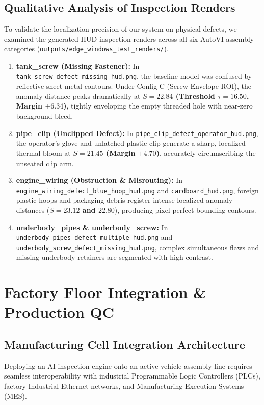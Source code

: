 \documentclass[journal,twocolumn]{IEEEtran}
\begin{document}
\subsection{Qualitative Analysis of Inspection Renders}
To validate the localization precision of our system on physical defects, we examined the generated HUD inspection renders across all six AutoVI assembly categories (\texttt{outputs/edge\_windows\_test\_renders/}).
\begin{enumerate}
    \item \textbf{tank\_screw (Missing Fastener):} In \texttt{tank\_screw\_defect\_missing\_hud.png}, the baseline model was confused by reflective sheet metal contours. Under Config C (Screw Envelope ROI), the anomaly distance peaks dramatically at \textbf{$S = 22.84$ (Threshold $\tau = 16.50$, Margin $+6.34$)}, tightly enveloping the empty threaded hole with near-zero background bleed.
    \item \textbf{pipe\_clip (Unclipped Defect):} In \texttt{pipe\_clip\_defect\_operator\_hud.png}, the operator's glove and unlatched plastic clip generate a sharp, localized thermal bloom at \textbf{$S = 21.45$ (Margin $+4.70$)}, accurately circumscribing the unseated clip arm.
    \item \textbf{engine\_wiring (Obstruction \& Misrouting):} In \texttt{engine\_wiring\_defect\_blue\_hoop\_hud.png} and \texttt{cardboard\_hud.png}, foreign plastic hoops and packaging debris register intense localized anomaly distances (\textbf{$S = 23.12$ and $22.80$}), producing pixel-perfect bounding contours.
    \item \textbf{underbody\_pipes \& underbody\_screw:} In \texttt{underbody\_pipes\_defect\_multiple\_hud.png} and \texttt{underbody\_screw\_defect\_missing\_hud.png}, complex simultaneous flaws and missing underbody retainers are segmented with high contrast.
\end{enumerate}

\section{Factory Floor Integration & Production QC}
\subsection{Manufacturing Cell Integration Architecture}
Deploying an AI inspection engine onto an active vehicle assembly line requires seamless interoperability with industrial Programmable Logic Controllers (PLCs), factory Industrial Ethernet networks, and Manufacturing Execution Systems (MES).
\end{document}
